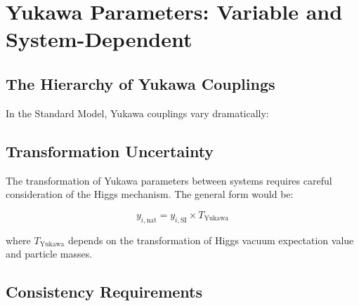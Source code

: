 	\section{Yukawa Parameters: Variable and System-Dependent}
	\label{sec:yukawa_parameters}
	
	\subsection{The Hierarchy of Yukawa Couplings}
	\label{subsec:yukawa_hierarchy}
	
	In the Standard Model, Yukawa couplings vary dramatically:
	
	\begin{table}[htbp]
		\centering
		\caption{Yukawa coupling hierarchy (5 orders of magnitude variation)}
		\label{tab:yukawa_hierarchy}
	\end{table}
	
	\subsection{Transformation Uncertainty}
	\label{subsec:yukawa_transformation}
	
	The transformation of Yukawa parameters between systems requires careful consideration of the Higgs mechanism. The general form would be:
	
	$$y_{i,\text{nat}} = y_{i,\text{SI}} \times T_{\text{Yukawa}}$$
	
	where $T_{\text{Yukawa}}$ depends on the transformation of Higgs vacuum expectation value and particle masses.
	
	\subsection{Consistency Requirements}
	\label{subsec:yukawa_consistency}
	
